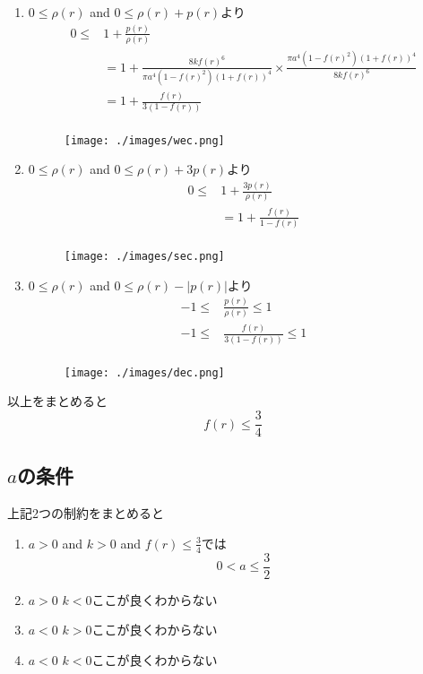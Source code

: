 \documentclass[dvipdfmx]{report} %
\begin{document}
\begin{enumerate}[(1)\,]
\item{$0 \leq \rho(r)$ and $0 \leq \rho(r) + p(r)$より}
\begin{equation*}
\begin{split}
	0 \leq & 1 + \frac{ p(r) }{ \rho(r) }\\
	&= 1 + \frac{ 8 k f(r)^6 }{ \pi a^4 ( 1 - f(r)^2 )( 1 + f(r) )^4 } \times \frac{ \pi a^4 ( 1 - f(r)^2 )( 1 + f(r) )^4 }{ 8 k f(r)^6 }\\
	&= 1 + \frac{ f(r) }{ 3( 1 - f(r) ) }\\
\end{split}
\end{equation*}
\begin{figure}[H]
\centering
\texttt{[image: ./images/wec.png]}
\caption{}
\label{}
\end{figure}

\item{$0 \leq \rho(r)$ and $0 \leq \rho(r) + 3p(r)$より}
\begin{equation*}
\begin{split}
	0 \leq & 1 + \frac{ 3p(r) }{ \rho(r) }\\
	&= 1 + \frac{ f(r) }{ 1 - f(r) }\\
\end{split}
\end{equation*}
\begin{figure}[H]
\centering
\texttt{[image: ./images/sec.png]}
\caption{}
\label{}
\end{figure}

\item{$0 \leq \rho(r)$ and $0 \leq \rho(r) - |p(r)|$より}
\begin{equation*}
\begin{split}
	-1 \leq & \frac{ p(r) }{ \rho(r) } \leq 1\\
	-1 \leq & \frac{ f(r) }{ 3 (1 - f(r) ) } \leq 1\\
\end{split}
\end{equation*}
\begin{figure}[H]
\centering
\texttt{[image: ./images/dec.png]}
\caption{}
\label{}
\end{figure}
\end{enumerate}
以上をまとめると
\[f(r) \leq \frac{3}{4}\]

\subsection{$a$の条件}
上記2つの制約をまとめると
\begin{enumerate}[(1)\,]
\item{$a>0$ and $k>0$ and $f(r) \leq \frac{3}{4}$では}\\
\[0 < a \leq \frac{3}{2}\]
\item{$a>0$  $k<0$ここが良くわからない}
\item{$a<0$  $k>0$ここが良くわからない}
\item{$a<0$  $k<0$ここが良くわからない}
\end{enumerate}
\end{document}

